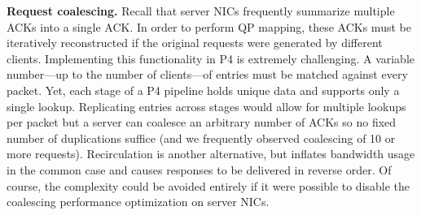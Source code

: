 

\textbf{Request coalescing.} Recall that server NICs frequently
summarize multiple ACKs into a single ACK.  In order to perform QP
mapping, these ACKs must be iteratively reconstructed if the
original requests were generated by different clients.
Implementing this functionality in P4 is extremely challenging. A
variable number---up to the number of clients---of entries must be
matched against every packet.  Yet, each stage of a P4 pipeline holds
unique data and supports only a single lookup.
Replicating entries across stages would allow for multiple lookups
per packet but a server can coalesce
an arbitrary number of ACKs so no fixed number of duplications suffice
(and we frequently observed coalescing of 10 or more requests).
Recirculation is another alternative, but inflates bandwidth usage in
the common case and causes responses to be delivered in reverse order.
Of course, the complexity could be avoided entirely if it were possible
to disable the coalescing performance optimization on server NICs.



